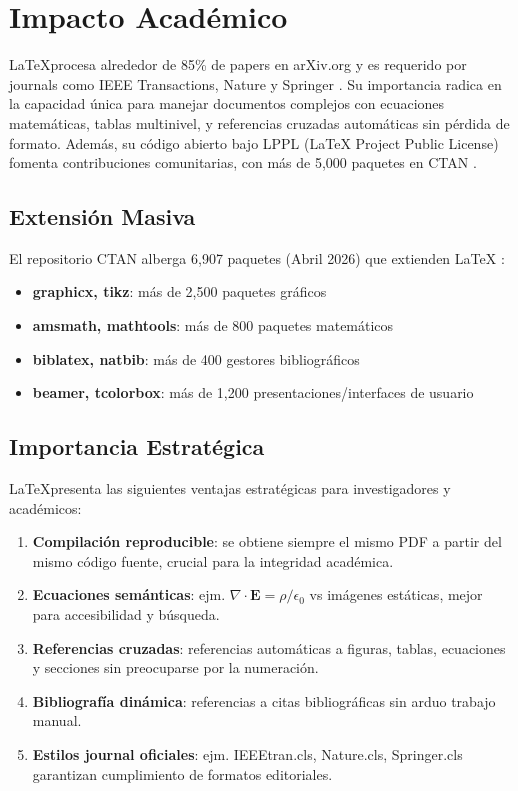 \section{Impacto Académico}
\LaTeX procesa alrededor de 85\% de papers en arXiv.org y es requerido por journals como IEEE Transactions, Nature y Springer \cite{ieee_requirements,arxiv_stats}. Su importancia radica en la capacidad única para manejar documentos complejos con ecuaciones matemáticas, tablas multinivel, y referencias cruzadas automáticas sin pérdida de formato. Además, su código abierto bajo LPPL (LaTeX Project Public License) fomenta contribuciones comunitarias, con más de 5,000 paquetes en CTAN \cite{ieeetran_doc}.

\subsection{Extensión Masiva}

El repositorio CTAN alberga 6,907 paquetes (Abril 2026) que extienden LaTeX \cite{ctan_stats}:

\begin{itemize}
    \item \textbf{graphicx, tikz}: más de 2,500 paquetes gráficos
    \item \textbf{amsmath, mathtools}: más de 800 paquetes matemáticos
    \item \textbf{biblatex, natbib}: más de 400 gestores bibliográficos
    \item \textbf{beamer, tcolorbox}: más de 1,200 presentaciones/interfaces de usuario
\end{itemize}

\subsection{Importancia Estratégica}

\LaTeX presenta las siguientes ventajas estratégicas para investigadores y académicos:

\begin{enumerate}
    \item \textbf{Compilación reproducible}: se obtiene siempre el mismo PDF a partir del mismo código fuente, crucial para la integridad académica.
    \item \textbf{Ecuaciones semánticas}: ejm. $\nabla\cdot\mathbf{E}=\rho/\epsilon_0$ vs imágenes estáticas, mejor para accesibilidad y búsqueda.
    \item \textbf{Referencias cruzadas}: referencias automáticas a figuras, tablas, ecuaciones y secciones sin preocuparse por la numeración.
    \item \textbf{Bibliografía dinámica}: referencias a citas bibliográficas sin arduo trabajo manual.
    \item \textbf{Estilos journal oficiales}: ejm. IEEEtran.cls, Nature.cls, Springer.cls garantizan cumplimiento de formatos editoriales.
\end{enumerate}